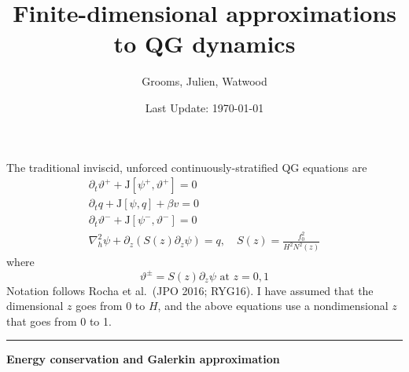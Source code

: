 \documentclass[10pt]{article}
\title{Finite-dimensional approximations to QG dynamics}
\author{Grooms, Julien, Watwood}
\date{Last Update: \today}
\newcommand{\pd}[1]{\partial_{#1}}
\newcommand{\tJ}{\text{J}}
\begin{document}
\maketitle

The traditional inviscid, unforced continuously-stratified QG equations are
\begin{gather}
\pd{t}\vartheta^+ + \tJ[\psi^+,\vartheta^+] = 0\\
\pd{t}q+\tJ[\psi,q]+\beta v = 0\\
\pd{t}\vartheta^-+ \tJ[\psi^-,\vartheta^-] = 0\\
\nabla_h^2\psi + \pd{z}\left(S(z)\pd{z}\psi\right) = q,\quad S(z) = \frac{f_0^2}{H^2N^2(z)}
\end{gather}
where 
\begin{equation}
\vartheta^\pm= S(z)\pd{z}\psi\text{ at }z=0,1
\end{equation}
Notation follows Rocha et al.~(JPO 2016; RYG16).
I have assumed that the dimensional $z$ goes from $0$ to $H$, and the above equations use a nondimensional $z$ that goes from 0 to 1.\\

\hrule
\begin{center}{\bf Energy conservation and Galerkin approximation}\end{center}
\end{document}
